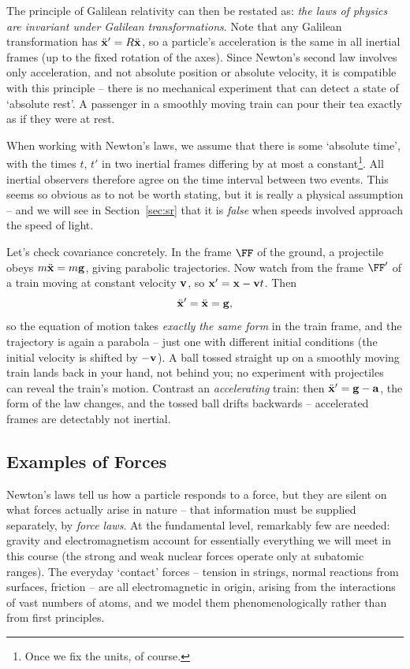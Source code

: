 \documentclass[a4paper]{scrartcl}
\begin{document}
The principle of Galilean relativity can then be restated as: \emph{the laws of physics are invariant under Galilean transformations}. Note that any Galilean transformation has $\ddot{\mathbf{x}}' = R\ddot{\mathbf{x}}$, so a particle's acceleration is the same in all inertial frames (up to the fixed rotation of the axes). Since Newton's second law involves only acceleration, and not absolute position or absolute velocity, it is compatible with this principle -- there is no mechanical experiment that can detect a state of `absolute rest'. A passenger in a smoothly moving train can pour their tea exactly as if they were at rest.

When working with Newton's laws, we assume that there is some `absolute time', with the times $t$, $t'$ in two inertial frames differing by at most a constant\footnote{Once we fix the units, of course.}. All inertial observers therefore agree on the time interval between two events. This seems so obvious as to not be worth stating, but it is really a physical assumption -- and we will see in Section~\ref{sec:sr} that it is \emph{false} when speeds involved approach the speed of light.

\begin{example}
	Let's check covariance concretely. In the frame $\FF$ of the ground, a projectile obeys $m\ddot{\mathbf{x}} = m \mathbf{g}$, giving parabolic trajectories. Now watch from the frame $\FF'$ of a train moving at constant velocity $\mathbf{v}$, so $\mathbf{x}' = \mathbf{x} - \mathbf{v} t$. Then
	$$
	\ddot{\mathbf{x}}' = \ddot{\mathbf{x}} = \mathbf{g},
	$$
	so the equation of motion takes \emph{exactly the same form} in the train frame, and the trajectory is again a parabola -- just one with different initial conditions (the initial velocity is shifted by $-\mathbf{v}$). A ball tossed straight up on a smoothly moving train lands back in your hand, not behind you; no experiment with projectiles can reveal the train's motion. Contrast an \emph{accelerating} train: then $\ddot{\mathbf{x}}' = \mathbf{g} - \mathbf{a}$, the form of the law changes, and the tossed ball drifts backwards -- accelerated frames are detectably not inertial.
\end{example}

\subsection{Examples of Forces}

Newton's laws tell us how a particle responds to a force, but they are silent on what forces actually arise in nature -- that information must be supplied separately, by \emph{force laws}. At the fundamental level, remarkably few are needed: gravity and electromagnetism account for essentially everything we will meet in this course (the strong and weak nuclear forces operate only at subatomic ranges). The everyday `contact' forces -- tension in strings, normal reactions from surfaces, friction -- are all electromagnetic in origin, arising from the interactions of vast numbers of atoms, and we model them phenomenologically rather than from first principles.
\end{document}
